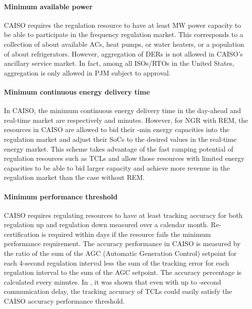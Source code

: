 \documentclass[onecolumn,journal]{IEEEtran}
\newcommand{\cut}[1]{}
\begin{document}
\begin{table}[tb]
\paragraph{Minimum available power} \ac{CAISO} requires the regulation resource to have at least  MW power capacity to be able to participate in the frequency regulation market. This corresponds to a collection of about  available ACs, heat pumps, or water heaters, or a population of about  refrigerators. However, aggregation of DERs is not allowed in \ac{CAISO}'s ancillary service market. In fact, among all ISOs/RTOs in the United States, aggregation is only allowed in \ac{PJM} subject to approval.


\paragraph{Minimum continuous energy delivery time} In \ac{CAISO}, the minimum continuous energy delivery time in the day-ahead and real-time market are respectively  and  minutes. However, for NGR with REM, the resources in \ac{CAISO} are allowed to bid their -min energy capacities into the regulation market and adjust their SoCs to the desired values in the real-time energy market. This scheme takes advantage of the fast ramping potential of regulation resources such as \acp{TCL} and allow those resources with limited energy capacities to be able to bid larger capacity and achieve more revenue in the regulation market than the case without REM. 

\paragraph{Minimum performance threshold} CAISO requires regulating resources to have at least  tracking accuracy for both regulation up and regulation down measured over a calendar month. Re-certification is required within  days if the resource fails the minimum performance requirement. The accuracy performance in CAISO is measured by the ratio of the sum of the AGC (Automatic Generation Control) setpoint for each 4-second regulation interval less the sum of  the tracking error for each regulation interval to the sum of the AGC setpoint. The accuracy percentage is calculated every  minutes.  In \cite{HH_BS_KP_TV_ACC:2014}, it was shown that even with up to -second communication delay, the tracking accuracy of \acp{TCL} could easily satisfy the CAISO accuracy performance threshold. \cut{ In \ac{PJM}, the participating resources are required to pass several tests with performance scores of  or above in order to be qualified for regulation service.}


\end{table}
\end{document}
